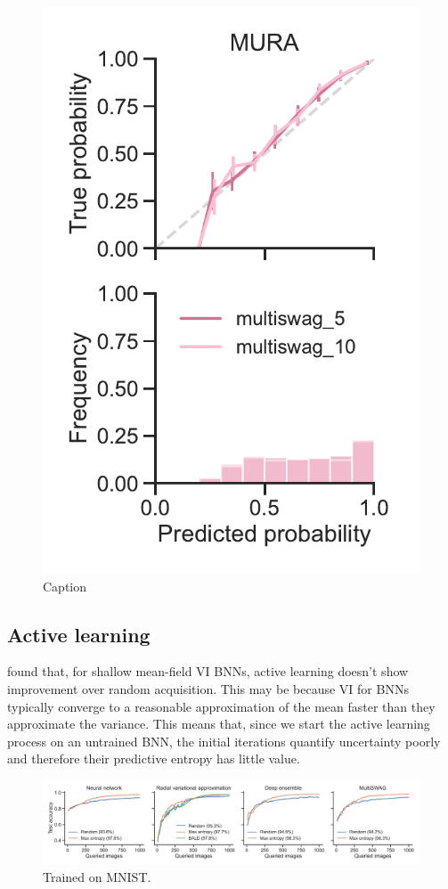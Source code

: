 \documentclass[10pt,a4paper,twocolumn]{article}
\begin{document}
\begin{figure}
    \centering
    \includegraphics[width=0.55\linewidth]{figures/MuraMultiSwag.pdf}
    \caption{Caption}
    \label{fig:mura-cc-multiswag}
\end{figure}


\subsection{Active learning}

\textcite{foong2020expressiveness} found that, for shallow mean-field VI BNNs, active learning doesn't show improvement over random acquisition.
This may be because VI for BNNs typically converge to a reasonable approximation of the mean faster than they approximate the variance.
This means that, since we start the active learning process on an untrained BNN, the initial iterations quantify uncertainty poorly and therefore their predictive entropy has little value.

\begin{figure}
    \centering
    \includegraphics[width=\textwidth]{figures/active_comparison_mnist.pdf}
    \caption{Trained on MNIST.}
    \label{fig:active=mnist}
\end{figure}
\end{document}
